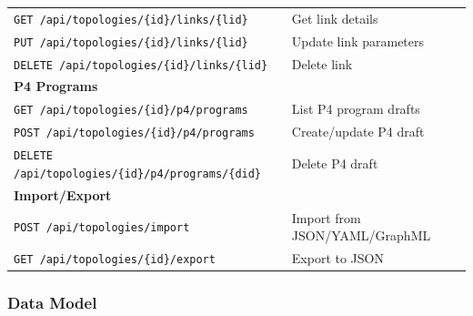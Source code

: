 \documentclass[10pt,a4paper]{article}
\begin{document}
\begin{table}[htbp]
\begin{tabularx}{\textwidth}{lX}
\texttt{GET /api/topologies/\{id\}/links/\{lid\}} & Get link details \\
\texttt{PUT /api/topologies/\{id\}/links/\{lid\}} & Update link parameters \\
\texttt{DELETE /api/topologies/\{id\}/links/\{lid\}} & Delete link \\
\midrule
\textbf{P4 Programs} & \\
\texttt{GET /api/topologies/\{id\}/p4/programs} & List P4 program drafts \\
\texttt{POST /api/topologies/\{id\}/p4/programs} & Create/update P4 draft \\
\texttt{DELETE /api/topologies/\{id\}/p4/programs/\{did\}} & Delete P4 draft \\
\midrule
\textbf{Import/Export} & \\
\texttt{POST /api/topologies/import} & Import from JSON/YAML/GraphML \\
\texttt{GET /api/topologies/\{id\}/export} & Export to JSON \\
\bottomrule
\end{tabularx}
\end{table}

\subsubsection{Data Model}
\end{document}
